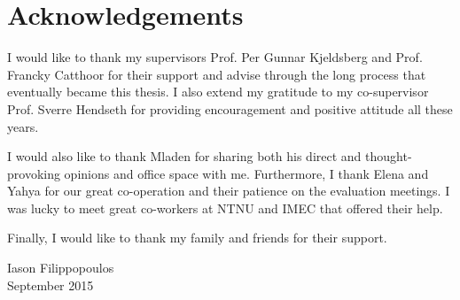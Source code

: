 \bigskip
\bigskip

\section*{Acknowledgements}

\bigskip

I would like to thank my supervisors Prof. Per Gunnar Kjeldsberg and Prof. Francky Catthoor for their support and advise through the long process that eventually became this thesis. 
I also extend my gratitude to my co-supervisor Prof. Sverre Hendseth for providing encouragement and positive attitude all these years.

I would also like to thank Mladen for sharing both his direct and thought-provoking opinions and office space with me.
Furthermore, I thank Elena and Yahya for our great co-operation and their patience on the evaluation meetings.
I was lucky to meet great co-workers at NTNU and IMEC that offered their help. 

Finally, I would like to thank my family and friends for their support. 

\bigskip

\begin{flushright}
Iason Filippopoulos \\
September 2015
\end{flushright}

\vspace*{\fill}
